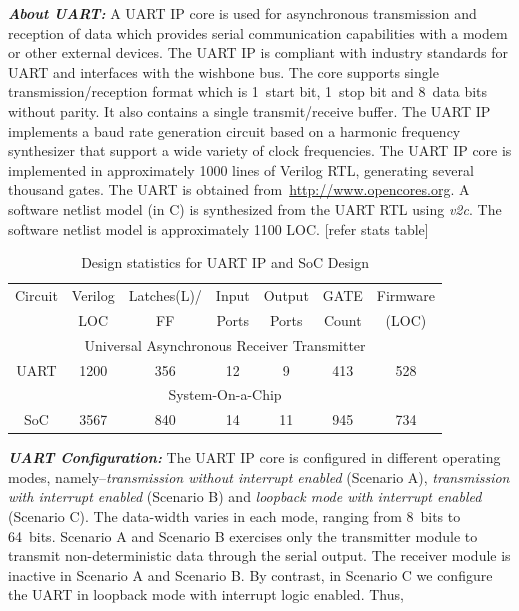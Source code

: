 \documentclass[sigconf]{acmart}
\newcommand{\rmcmt}[1]{{\color{magenta} [{#1}]}}
\begin{document}
\textbf{\emph{About UART:}} A UART IP core is used for asynchronous
transmission and reception of data which provides serial communication
capabilities with a modem or other external devices.  The UART IP is
compliant with industry standards for UART and interfaces with the wishbone
bus.  The core supports single transmission/reception format which is
1~start bit, 1~stop bit and 8~data bits without parity.  It also contains a
single transmit/receive buffer.  The UART IP implements a baud rate
generation circuit based on a harmonic frequency synthesizer that support a
wide variety of clock frequencies.  The UART IP core is implemented in
approximately 1000 lines of Verilog RTL, generating several thousand gates. 
The UART is obtained from~\url{http://www.opencores.org}.  A software
netlist model (in C) is synthesized from the UART RTL using \emph{v2c}.  The
software netlist model is approximately 1100 LOC.
\rmcmt{refer stats table}
%
\begin{table}
\begin{center}
{
\scriptsize
\begin{tabular}{|c|c|c|c|c|c|c|}
\hline
  Circuit & Verilog & Latches(L)/ & Input & Output & GATE & Firmware \\
  & LOC & FF & Ports & Ports & Count & (LOC)\\ 
\cline{1-7}
\multicolumn{7}{|c|}{Universal Asynchronous Receiver Transmitter} \\ \hline 
  UART & 1200 & 356 & 12 & 9 & 413 & 528 \\ \hline
\multicolumn{7}{|c|}{System-On-a-Chip} \\ \hline 
  SoC & 3567 & 840 & 14 & 11 & 945 & 734 \\ \hline
\end{tabular}
}
\end{center}
\caption{Design statistics for UART IP and SoC Design}
\label{table:stats}
\end{table}  
%
\textbf{\emph{UART Configuration:}} The UART IP core is configured in
different operating modes, namely--{\em transmission without interrupt
enabled} (Scenario A), {\em transmission with interrupt enabled} (Scenario
B) and {\em loopback mode with interrupt enabled} (Scenario C).  The
data-width varies in each mode, ranging from 8~bits to 64~bits.  Scenario A
and Scenario B exercises only the transmitter module to transmit
non-deterministic data through the serial output.  The receiver module is
inactive in Scenario A and Scenario B.  By contrast, in Scenario C we
configure the UART in loopback mode with interrupt logic enabled.  Thus,
\end{document}
